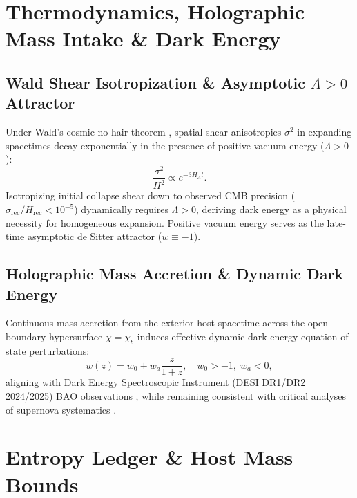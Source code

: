 \documentclass[11pt,a4paper]{article}
\theoremstyle{definition}
\begin{document}
\section{Thermodynamics, Holographic Mass Intake \& Dark Energy}\label{sec:thermo_dark_energy}

\subsection{Wald Shear Isotropization \& Asymptotic $\Lambda > 0$ Attractor}\label{sec:wald_theorem}
Under Wald's cosmic no-hair theorem \cite{wald1983}, spatial shear anisotropies $\sigma^2$ in expanding spacetimes decay exponentially in the presence of positive vacuum energy ($\Lambda > 0$):
\begin{equation}\label{eq:shear_decay}
    \frac{\sigma^2}{H^2} \propto e^{-3 H_\Lambda t}.
\end{equation}
Isotropizing initial collapse shear down to observed CMB precision ($\sigma_{\text{rec}}/H_{\text{rec}} < 10^{-5}$) dynamically requires $\Lambda > 0$, deriving dark energy as a physical necessity for homogeneous expansion. Positive vacuum energy serves as the late-time asymptotic de Sitter attractor ($w \equiv -1$).

\subsection{Holographic Mass Accretion \& Dynamic Dark Energy}\label{sec:mass_intake}
Continuous mass accretion from the exterior host spacetime across the open boundary hypersurface $\chi = \chi_b$ induces effective dynamic dark energy equation of state perturbations:
\begin{equation}\label{eq:eos_dynamic}
    w(z) = w_0 + w_a \frac{z}{1+z}, \quad w_0 > -1, \; w_a < 0,
\end{equation}
aligning with Dark Energy Spectroscopic Instrument (DESI DR1/DR2 2024/2025) BAO observations \cite{desi2024, desi2025}, while remaining consistent with critical analyses of supernova systematics \cite{efstathiou2025}.

\section{Entropy Ledger \& Host Mass Bounds}\label{sec:entropy_mass}
\end{document}
